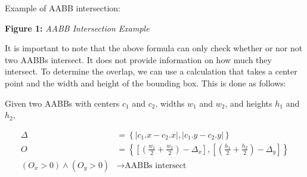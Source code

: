 Example of AABB intersection:
\begin{center}
\end{center}

\begin{center}
    \textbf{Figure 1:} \textit{AABB Intersection Example}

\end{center}

It is important to note that the above formula can only check whether or nor
not two AABBs intersect. It does not provide information on how much they
intersect. To determine the overlap, we can use a calculation that takes a
center point and the width and height of the bounding box. This is done as
follows:

Given two AABBs with centers $c_1$ and $c_2$, widths $w_1$ and $w_2$, and
heights $h_1$ and $h_2$,

\begin{equation}
    \begin{aligned}
        \Delta                        & = \left\{ \left| c_1.x - c_2.x \right| , \left| c_1.y - c_2.y \right| \right\}                                                                                     \\
        O                             & = \left\{ \left[ \left( \frac{w_1}{2} + \frac{w_2}{2} \right) - \Delta_x \right] , \left[ \left( \frac{h_1}{2} + \frac{h_2}{2} \right) - \Delta_y \right] \right\} \\
        ( O_x > 0 ) \land ( O_y > 0 ) & \rightarrow \text{AABBs intersect}
    \end{aligned}
\end{equation}

